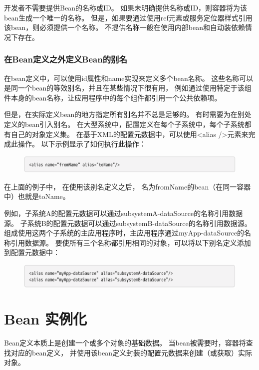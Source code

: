 开发者不需要提供Bean的名称或ID。 
如果未明确提供名称或ID，则容器将为该bean生成一个唯一的名称。 
但是，如果要通过使用ref元素或服务定位器样式引用该bean，则必须提供一个名称。
不提供名称一般在使用内部bean和自动装依赖情况下存在。


\subsubsection{在Bean定义之外定义Bean的别名}
在bean定义中，可以使用id属性和name实现来定义多个bean名称。
这些名称可以是同一个bean的等效别名，并且在某些情况下很有用，
例如通过使用特定于该组件本身的bean名称，让应用程序中的每个组件都引用一个公共依赖项。

但是，在实际定义bean的地方指定所有别名并不总是足够的。 
有时需要为在别处定义的bean引入别名。 
在大型系统中，配置定义在每个子系统中，每个子系统都有自己的对象定义集。 
在基于XML的配置元数据中，可以使用<alias />元素来完成此操作。 
以下示例显示了如何执行此操作：

\begin{figure}[ht]
    \centering
    \includegraphics[width=1\linewidth]{./Figure/IMG_code_12.png}
\end{figure}
在上面的例子中，
在使用该别名定义之后，
名为fromName的bean（在同一容器中）也就是toName。

例如，子系统A的配置元数据可以通过subsystemA-dataSource的名称引用数据源。 
子系统B的配置元数据可以通过subsystemB-dataSource的名称引用数据源。 
组成使用这两个子系统的主应用程序时，主应用程序通过myApp-dataSource的名称引用数据源。
要使所有三个名称都引用相同的对象，可以将以下别名定义添加到配置元数据中：

\begin{figure}[ht]
    \centering
    \includegraphics[width=1\linewidth]{./Figure/IMG_code_13.png}
\end{figure}

\section{Bean 实例化}
Bean定义本质上是创建一个或多个对象的基础数据。 
当bean被需要时，容器将查找对应的bean定义，
并使用该bean定义封装的配置元数据来创建（或获取）实际对象。


